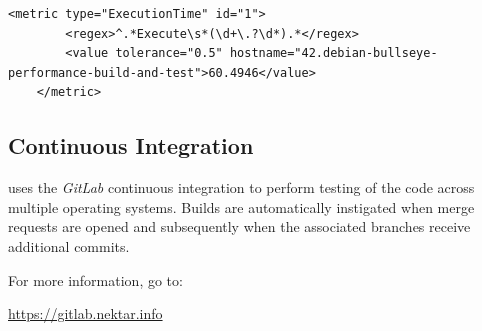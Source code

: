 \begin{lstlisting}[firstnumber=16]
    <metric type="ExecutionTime" id="1">
        <regex>^.*Execute\s*(\d+\.?\d*).*</regex>
        <value tolerance="0.5" hostname="42.debian-bullseye-performance-build-and-test">60.4946</value>
    </metric>
\end{lstlisting}

\subsection{Continuous Integration}
{\nek} uses the \emph{GitLab} continuous integration to perform testing of the code across multiple operating systems.  Builds are automatically instigated when merge requests are opened and subsequently when the associated branches receive additional commits.

For more information, go to:

\url{https://gitlab.nektar.info}


%


